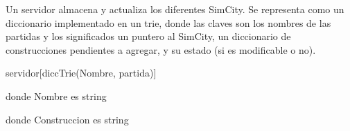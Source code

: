 \begin{Representacion}
  
  
    Un servidor almacena y actualiza los diferentes SimCity. Se representa como un 
    diccionario implementado en un trie, donde las claves son los nombres de las partidas
    y los significados un puntero al SimCity, un diccionario de construcciones pendientes a agregar, y su estado (si es modificable o no).
  
    \begin{Estructura}{servidor}[diccTrie(Nombre, partida)]
        \begin{Tupla}[partida]
        \end{Tupla}

        \vspace{2mm}
        \begin{Tupla}[pos]
        \end{Tupla}

        \vspace{2mm}
        donde Nombre es string

        \vspace{2mm}
        donde Construccion es string

    \end{Estructura}
    
    \vspace{2mm}


\end{Representacion}

